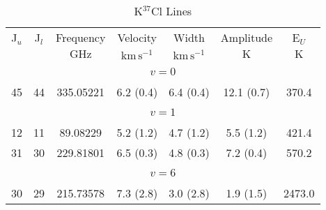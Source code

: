 \begin{table*}[htp]
\centering
\caption{K$^{37}$Cl Lines}
\begin{tabular}{ccccccc}
\label{tab:K37Cl_salt_lines}
 J$_u$ & J$_l$ & Frequency & Velocity & Width & Amplitude & E$_U$ \\
  &  & $\mathrm{GHz}$ & $\mathrm{km\,s^{-1}}$ & $\mathrm{km\,s^{-1}}$ & $\mathrm{K}$ & $\mathrm{K}$ \\
\hline
&\vspace{-0.75em}\\
\multicolumn{7}{c}{$v = 0$} \\
\vspace{-0.75em}\\
 45 & 44 & 335.05221 & 6.2 (0.4) & 6.4 (0.4) & 12.1 (0.7) & 370.4 \\
&\vspace{-0.75em}\\
\multicolumn{7}{c}{$v = 1$} \\
\vspace{-0.75em}\\
 12 & 11 & 89.08229 & 5.2 (1.2) & 4.7 (1.2) & 5.5 (1.2) & 421.4 \\
 31 & 30 & 229.81801 & 6.5 (0.3) & 4.8 (0.3) & 7.2 (0.4) & 570.2 \\
\hline
&\vspace{-0.75em}\\
\multicolumn{7}{c}{$v = 6$} \\
\vspace{-0.75em}\\
 30 & 29 & 215.73578 & 7.3 (2.8) & 3.0 (2.8) & 1.9 (1.5) & 2473.0 \\
\end{tabular}

\par 
\end{table*}
